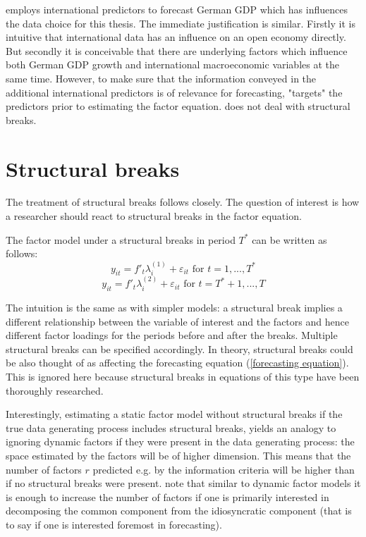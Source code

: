\documentclass[12pt]{article}
\begin{document}
\citet{schumacher2010factor} employs international predictors to forecast German GDP which has influences the data choice for this thesis. The immediate justification is similar. Firstly it is intuitive that international data has an influence on an open economy directly. But secondly it is conceivable that there are underlying factors which influence both German GDP growth and international macroeconomic variables at the same time. However, to make sure that the information conveyed in the additional international predictors is of relevance for forecasting, \citet{schumacher2010factor} "targets" the predictors prior to estimating the factor equation. \citet{schumacher2010factor} does not deal with structural breaks.



\section{Structural breaks}
The treatment of structural breaks follows \citet{breitung2011testing} closely. The question of interest is how a researcher should react to structural breaks in the factor equation.

The factor model under a structural breaks in period $T^*$ can be written as follows:
\begin{equation}
	\label{}
	y_{it} = f'_t\lambda_i^{(1)} + \varepsilon_{it} \text{ for } t = 1, ..., T^*
\end{equation}
\begin{equation}
	\label{}
	y_{it} = f'_t\lambda_i^{(2)} + \varepsilon_{it} \text{ for } t = T^* + 1, ..., T
\end{equation}

The intuition is the same as with simpler models: a structural break implies a different relationship between the variable of interest and the factors and hence different factor loadings for the periods before and after the breaks. Multiple structural breaks can be specified accordingly. In theory, structural breaks could be also thought of as affecting the forecasting equation (\ref{forecasting equation}). This is ignored here because structural breaks in equations of this type have been thoroughly researched.


Interestingly, estimating a static factor model without structural breaks if the true data generating process includes structural breaks, yields an analogy to ignoring dynamic factors if they were present in the data generating process: the space estimated by the factors will be of higher dimension. This means that the number of factors $r$ predicted e.g. by the \citet{bai2002determining} information criteria will be higher than if no structural breaks were present. \citet{breitung2011testing} note that similar to dynamic factor models it is enough to increase the number of factors if one is primarily interested in decomposing the common component from the idiosyncratic component (that is to say if one is interested foremost in forecasting).
\end{document}
